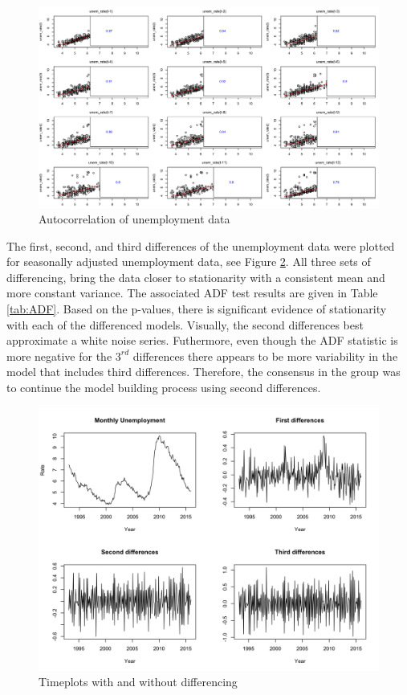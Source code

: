 \documentclass[twoside,twocolumn]{article}
\begin{document}
		\begin{figure}[htb]
		\centering
		\caption{Autocorrelation of unemployment data}
		\label{fig:laggedunemployment}
		\includegraphics[width=\linewidth]{images/laggedunemployment}
	\end{figure}
The first, second, and third differences of the unemployment data were plotted for seasonally adjusted unemployment data, see Figure \ref{fig:seasonalunem}. All three sets of differencing, bring the data closer to stationarity with a consistent mean and more constant variance. The associated ADF test results are given in Table \ref{tab:ADF}. Based on the p-values, there is significant evidence of stationarity with each of the differenced models. Visually, the second differences best approximate a white noise series. Futhermore, even though the ADF statistic is more negative for the \(3^{rd}\) differences there appears to be more variability in the model that includes third differences.  Therefore, the consensus in the group was to continue the model building process using second differences.
	\begin{figure}[htb]
		\centering
		\caption{Timeplots with and without differencing}
		\label{fig:seasonalunem}
		\includegraphics[width=\linewidth]{images/seasonalunem}
	\end{figure}
		 
\end{document}
